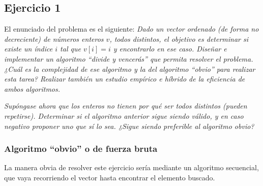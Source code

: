\documentclass[10pt,a4paper]{article}
\begin{document}
\subsection{Ejercicio 1}
El enunciado del problema es el siguiente: \textit{Dado un vector ordenado (de forma no decreciente) de números enteros \(v\), todos distintos, el objetivo es determinar si existe un índice \(i\) tal que \(v[i] = i\) y encontrarlo en ese caso. Diseñar e implementar un algoritmo ``divide y vencerás'' que permita resolver el problema. ¿Cuál es la complejidad de ese algoritmo y la del algoritmo ``obvio'' para realizar esta tarea? Realizar también un estudio empírico e híbrido de la eficiencia de ambos algoritmos.}

\textit{Supóngase ahora que los enteros no tienen por qué ser todos distintos (pueden repetirse). Determinar si el algoritmo anterior sigue siendo válido, y en caso negativo proponer uno que sí lo sea. ¿Sigue siendo preferible al algoritmo obvio?}

\subsubsection{Algoritmo ``obvio'' o de fuerza bruta}
La manera obvia de resolver este ejercicio sería mediante un algoritmo secuencial, que vaya recorriendo el vector hasta encontrar el elemento buscado. 
\end{document}
